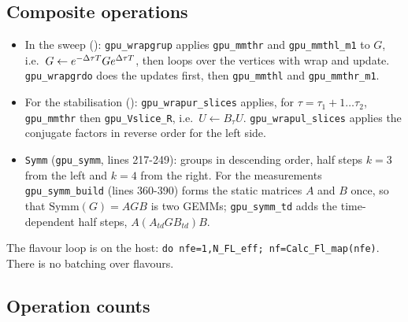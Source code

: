 \subsection{Composite operations}

\begin{itemize}
\item In the sweep (): \texttt{gpu\_wrapgrup} applies \texttt{gpu\_mmthr} and \texttt{gpu\_mmthl\_m1} to $G$, i.e.\ $G\leftarrow e^{-\Delta\tau T}Ge^{\Delta\tau T}$, then loops over the vertices with wrap and update. \texttt{gpu\_wrapgrdo} does the updates first, then \texttt{gpu\_mmthl} and \texttt{gpu\_mmthr\_m1}.
\item For the stabilisation (): \texttt{gpu\_wrapur\_slices} applies, for $\tau=\tau_1+1\ldots\tau_2$, \texttt{gpu\_mmthr} then \texttt{gpu\_Vslice\_R}, i.e.\ $U\leftarrow B_\tau U$. \texttt{gpu\_wrapul\_slices} applies the conjugate factors in reverse order for the left side.
\item \texttt{Symm} (\texttt{gpu\_symm}, lines 217-249): groups in descending order, half steps $k=3$ from the left and $k=4$ from the right. For the measurements \texttt{gpu\_symm\_build} (lines 360-390) forms the static matrices $A$ and $B$ once, so that $\mathrm{Symm}(G)=AGB$ is two GEMMs; \texttt{gpu\_symm\_td} adds the time-dependent half steps, $A(A_{td}GB_{td})B$.
\end{itemize}
The flavour loop is on the host: \texttt{do nfe=1,N\_FL\_eff; nf=Calc\_Fl\_map(nfe)}. There is no batching over flavours.


\subsection{Operation counts}

